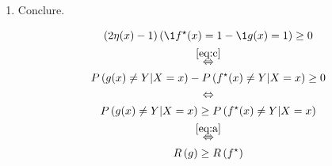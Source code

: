 {\begin{enumerate}
		\item Conclure.

		      \begin{reponse}
			      \begin{gather*}
				      \left(2\eta(x)-1\right)\left(\1{f^{\star}(x)=1}-\1{g(x)=1}\right) \geq 0\\
				      \overset{\ref{eq:c}}{\Leftrightarrow}\\
				      P\left(g(x)\neq Y | X=x\right)-P\left(f^{\star}(x)\neq Y|X=x\right) \geq 0\\
				      \Leftrightarrow\\
				      P\left(g(x)\neq Y | X=x\right) \geq P\left(f^{\star}(x)\neq Y|X=x\right)\\
				      \overset{\ref{eq:a}}{\Leftrightarrow}\\
				      R\left(g\right) \geq R\left(f^{\star}\right)
			      \end{gather*}
		      \end{reponse}

	\end{enumerate}
}
